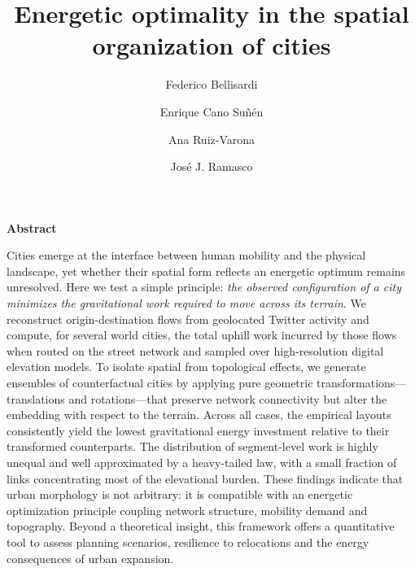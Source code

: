 \documentclass[twocolumn,amsmath,amssymb,floatfix,nature,shownopacs,footinbib,superscriptaddress]{revtex4-1} %
\begin{document}
\title{Energetic optimality in the spatial organization of cities}

\author{Federico Bellisardi}

\author{Enrique Cano Su\~n\'en}

\author{Ana Ruiz-Varona}

\author{Jos\'e J. Ramasco}

\maketitle
\textbf{Abstract} 

Cities emerge at the interface between human mobility and the physical landscape, yet whether their spatial form reflects an energetic optimum remains unresolved. Here we test a simple principle: \emph{the observed configuration of a city minimizes the gravitational work required to move across its terrain}. We reconstruct origin-destination flows from geolocated Twitter activity and compute, for several world cities, the total uphill work incurred by those flows when routed on the street network and sampled over high-resolution digital elevation models. To isolate spatial from topological effects, we generate ensembles of counterfactual cities by applying pure geometric transformations—translations and rotations—that preserve network connectivity but alter the embedding with respect to the terrain. Across all cases, the empirical layouts consistently yield the lowest gravitational energy investment relative to their transformed counterparts. The distribution of segment-level work is highly unequal and well approximated by a heavy-tailed law, with a small fraction of links concentrating most of the elevational burden. These findings indicate that urban morphology is not arbitrary: it is compatible with an energetic optimization principle coupling network structure, mobility demand and topography. Beyond a theoretical insight, this framework offers a quantitative tool to assess planning scenarios, resilience to relocations and the energy consequences of urban expansion.
\end{document}
